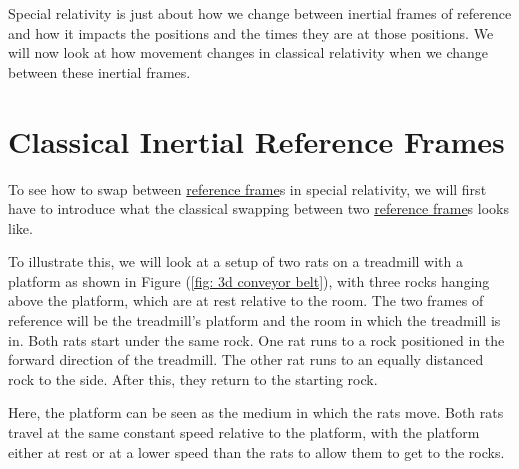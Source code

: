 Special relativity is just about how we change between inertial frames of reference and how it impacts the positions and the times they are at those positions.
We will now look at how movement changes in classical relativity when we change between these inertial frames.


\section{Classical Inertial Reference Frames}

To see how to swap between \hyperlink{def-Reference-frame}{reference frame}s in special relativity, we will first have to introduce what the classical swapping between two \hyperlink{def-Reference-frame}{reference frame}s looks like.

To illustrate this, we will look at a setup of two rats on a treadmill with a platform as shown in Figure (\ref{fig: 3d conveyor belt}), with three rocks hanging above the platform, which are at rest relative to the room.
The two frames of reference will be the treadmill's platform and the room in which the treadmill is in.
Both rats start under the same rock.
One rat runs to a rock positioned in the forward direction of the treadmill.
The other rat runs to an equally distanced rock to the side.
After this, they return to the starting rock.

Here, the platform can be seen as the medium in which the rats move.
Both rats travel at the same constant speed relative to the platform, with the platform either at rest or at a lower speed than the rats to allow them to get to the rocks.


